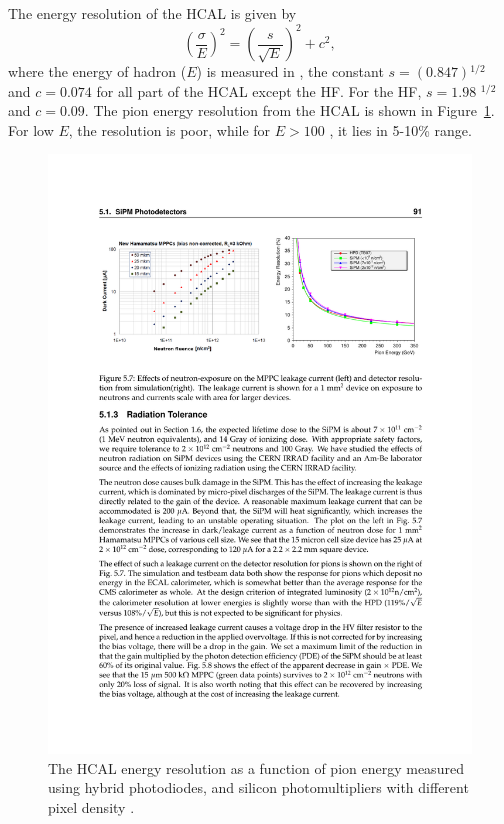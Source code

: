 The energy resolution of the HCAL is given by
\begin{equation}
	\left(\frac{\sigma}{E}\right)^2 = \left(\frac{s}{\sqrt{E}}\right)^2 + c^2,
\end{equation}
where the energy of hadron ($E$) is measured in \GeV, the constant 
$s = (0.847)$\GeV$^{1/2}$ and $c = 0.074$ for all part of 
the HCAL except the HF. For the HF, $s = 1.98 $ \GeV $^{1/2}$ and $c = 0.09$.
The pion energy resolution from the HCAL is shown in Figure~\ref{fig:cms_hcal_reso}.
For low $E$, the resolution is poor, while for $E > 100$ \GeV, it lies in 5-10\%
range.
\begin{figure}
  \begin{center}
  \includegraphics[width=0.50\linewidth]{Experiment/CMS/Image/HCAL/cms_hcal_reso.pdf}
  \caption{The HCAL energy resolution as a function of pion energy measured using
	  hybrid photodiodes, and silicon photomultipliers with different pixel
	  density \cite{Mans:1481837}.}
  \label{fig:cms_hcal_reso}
  \end{center}
\end{figure}
